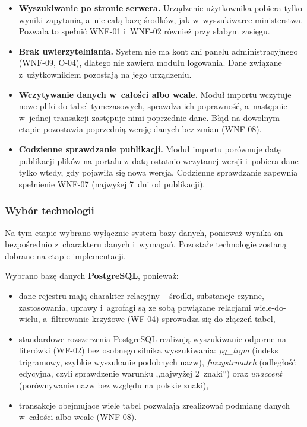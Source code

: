 \begin{itemize}
    \item \textbf{Wyszukiwanie po stronie serwera.} Urządzenie użytkownika
    pobiera tylko wyniki zapytania, a~nie całą bazę środków, jak w~wyszukiwarce
    ministerstwa. Pozwala to spełnić WNF-01 i~WNF-02 również przy słabym
    zasięgu.
    \item \textbf{Brak uwierzytelniania.} System nie ma kont ani panelu
    administracyjnego (WNF-09, O-04), dlatego nie zawiera modułu logowania.
    Dane związane z~użytkownikiem pozostają na jego urządzeniu.
    \item \textbf{Wczytywanie danych w~całości albo wcale.} Moduł importu
    wczytuje nowe pliki do tabel tymczasowych, sprawdza ich poprawność,
    a~następnie w~jednej transakcji zastępuje nimi poprzednie dane. Błąd na
    dowolnym etapie pozostawia poprzednią wersję danych bez zmian (WNF-08).
    \item \textbf{Codzienne sprawdzanie publikacji.} Moduł importu porównuje
    datę publikacji plików na portalu z~datą ostatnio wczytanej wersji
    i~pobiera dane tylko wtedy, gdy pojawiła się nowa wersja. Codzienne
    sprawdzanie zapewnia spełnienie WNF-07 (najwyżej 7~dni od publikacji).
\end{itemize}

\subsubsection{Wybór technologii}

Na tym etapie wybrano wyłącznie system bazy danych, ponieważ wynika on
bezpośrednio z~charakteru danych i~wymagań. Pozostałe technologie zostaną
dobrane na etapie implementacji.

Wybrano bazę danych \textbf{PostgreSQL}, ponieważ:

\begin{itemize}
    \item dane rejestru mają charakter relacyjny -- środki, substancje czynne,
    zastosowania, uprawy i~agrofagi są ze sobą powiązane relacjami
    wiele-do-wielu, a~filtrowanie krzyżowe (WF-04) sprowadza się do złączeń
    tabel,
    \item standardowe rozszerzenia PostgreSQL realizują wyszukiwanie odporne
    na literówki (WF-02) bez osobnego silnika wyszukiwania: \emph{pg\_trgm}
    (indeks trigramowy, szybkie wyszukanie podobnych nazw),
    \emph{fuzzystrmatch} (odległość edycyjna, czyli sprawdzenie warunku
    ,,najwyżej 2~znaki'') oraz \emph{unaccent} (porównywanie nazw bez względu
    na polskie znaki),
    \item transakcje obejmujące wiele tabel pozwalają zrealizować podmianę
    danych w~całości albo wcale (WNF-08).
\end{itemize}

